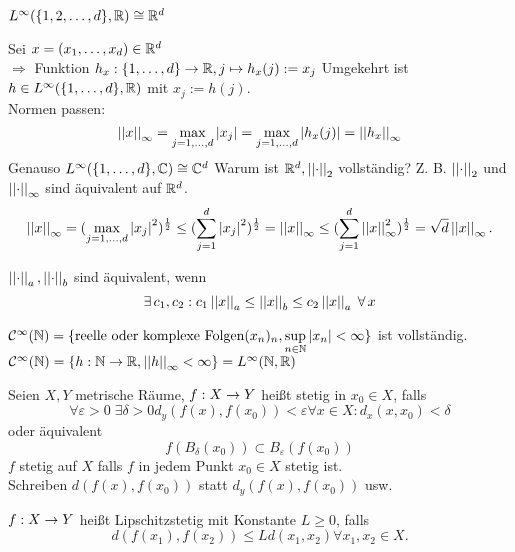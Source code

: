 \documentclass[../ana2.tex]{subfiles}
\begin{document}
\begin{beh}
    \( L^\infty(\{1,2,\dots,d\}, \mathbb{R}) \cong \mathbb{R}^d \)
\end{beh}
\begin{bew}
    Sei \( x = (x_1,\dots,x_d) \in \mathbb{R}^d \) \\
    \( \Rightarrow \) Funktion 
    \( h_x:\{1,\dots,d\}\rightarrow \mathbb{R}, j \mapsto h_x(j) := x_j \)
    Umgekehrt ist \( h \in L^\infty(\{1,\dots,d\}, \mathbb{R}) \)
    mit \( x_j := h(j) \). \\
    Normen passen:
    \[ \left|\left|x\right|\right|_\infty = \underset{j=1,\dots,d}{\max} \left|x_j\right|
    = \underset{j=1,\dots,d}{\max} \left|h_x(j)\right| = \left|\left|h_x\right|\right|_\infty \]
    Genauso \( L^\infty(\{1,\dots,d\}, \mathbb{C}) \cong \mathbb{C}^d \)
    Warum ist \( \mathbb{R}^d, \left|\left|\cdot\right|\right|_2 \) vollständig?
    Z. B. \( \left|\left|\cdot\right|\right|_2 \) und \( \left|\left|\cdot\right|\right|_\infty \) 
    sind äquivalent auf \( \mathbb{R}^d \).
    \[ \left|\left|x\right|\right|_\infty 
    = (\underset{j=1,\ldots,d}{\max} 
    \left|x_j\right|^2 )^{\frac{1}{2}} 
    \leq (\sum_{j=1}^d \left|x_j\right|^2)^{\frac{1}{2}}
    = \left|\left|x\right|\right|_\infty 
    \leq (\sum_{j=1}^d \left|\left|x\right|\right|_\infty^2)^{\frac{1}{2}}
    = \sqrt{d} \left|\left|x\right|\right|_\infty. \]
\end{bew}
\begin{defi*}
    \( \left|\left|\cdot\right|\right|_a, \left|\left|\cdot\right|\right|_b \) sind äquivalent, wenn
    \[ \exists c_1, c_2: c_1\norm{x}_a \leq \norm{x}_b 
    \leq c_2\norm{x}_a \; \forall x \]
\end{defi*}
\begin{bsp}
    \( \mathcal{C}^\infty(\mathbb{N}) 
    = \{\text{reelle oder komplexe Folgen}
    (x_n)_n, \underset{n\in\mathbb{N}}{\sup} \left|x_n\right| < \infty\} \) ist
    vollständig.
    \( \mathcal{C}^\infty(\mathbb{N}) 
    = \{h:\mathbb{N}\rightarrow \mathbb{R}, \left|\left|h\right|\right|_\infty < \infty\}
    = L^\infty(\mathbb{N}, \mathbb{R}) \)
\end{bsp}
\begin{defi}[Stetigkeit]
    Seien \(X, Y \) metrische Räume, \(f:X\rightarrow Y\)
    heißt stetig in \(x_0 \in X\), falls 
    \[ \forall \varepsilon > 0 \; \exists \delta > 0
    d_y(f(x), f(x_0)) < \varepsilon \forall x \in X: 
    d_x(x, x_0) < \delta \]
    oder äquivalent 
    \[ f(B_\delta(x_0)) \subset B_\varepsilon(f(x_0)) \]
    \(f\) stetig auf \(X\) falls \(f\) in jedem Punkt 
    \(x_0 \in X\) stetig ist. \\
    Schreiben \( d(f(x), f(x_0)) \) 
    statt \( d_y(f(x), f(x_0)) \) usw.
\end{defi}    
\begin{defi}[Lipschitzstetig]
    \( f:X\rightarrow Y \) heißt Lipschitzstetig 
    mit Konstante \( L \geq 0 \), falls 
    \[ d(f(x_1), f(x_2)) 
    \leq L d(x_1, x_2) \forall x_1, x_2 \in X. \]
\end{defi}
\end{document}
